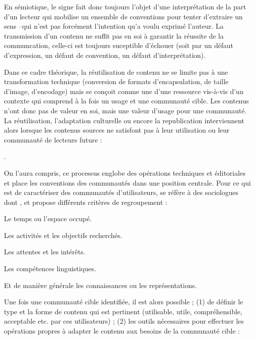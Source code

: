 En sémiotique, le signe fait donc toujours l'objet d'une interprétation de la part d'un lecteur qui mobilise un ensemble de conventions pour tenter d'extraire un sens --qui n'est pas forcément l'intention qu'a voulu exprimé l'auteur.
La transmission d'un contenu ne suffit pas en soi à garantir la réussite de la communcation, celle-ci est toujours suceptible d'échouer (soit par un défaut d'expression, un défaut de convention, un défaut d'interprétation). 

Dans ce cadre théorique, la réutilisation de contenu ne se limite pas à une transformation technique (conversion de formats d'encapsulation, de taille d'image, d'encodage) mais se conçoit comme une  \parencite{Stockinger2007} d'une ressource vis-à-vis d'un contexte qui comprend à la fois un usage et une communauté cible. 
Les contenus n'ont donc pas de valeur en soi, mais une valeur d'usage pour une communauté. 
La réutilisation, l'adaptation culturelle ou encore la republication interviennent alors lorsque les contenus sources ne satisfont pas à leur utilisation ou leur communauté de lecteurs future : 

 \parencite{Stockinger2007b}.


On l'aura compris, ce processus englobe des opérations techniques et éditoriales et place les conventions des communautés dans une position centrale. 
Pour ce qui est de caractériser des communautés d'utilisateurs,  se réfère à des sociologues dont \cite{Bourdieu}, et propose différents critères de regroupement :
\begin{liste}
	\item Le temps ou l'espace occupé.
	\item Les activités et les objectifs recherchés.
	\item Les attentes et les intérêts.
	\item Les compétences linguistiques.
	\item Et de manière générale les connaissances ou les représentations.
\end{liste}

Une fois une communauté cible identifiée, il est alors possible ; (1) de définir le type et la forme de contenu qui est pertinent (utilisable, utile, compréhensible, acceptable etc. par ces utilisateurs) ; (2) les outils nécessaires pour effectuer les opérations propres à adapter le contenu aux besoins de la communauté cible :

